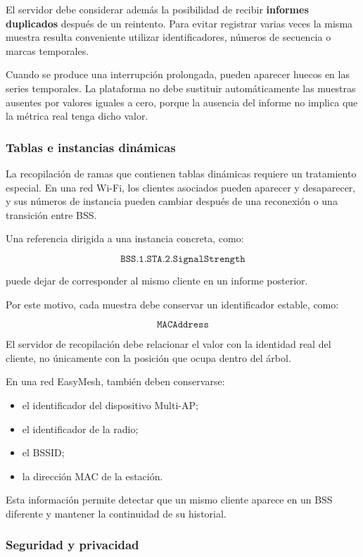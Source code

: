 El servidor debe considerar además la posibilidad de recibir
\textbf{informes duplicados} después de un reintento. Para evitar
registrar varias veces la misma muestra resulta conveniente utilizar
identificadores, números de secuencia o marcas temporales.

Cuando se produce una interrupción prolongada, pueden aparecer huecos en
las series temporales. La plataforma no debe sustituir automáticamente
las muestras ausentes por valores iguales a cero, porque la ausencia del
informe no implica que la métrica real tenga dicho valor.


\subsubsection*{Tablas e instancias dinámicas}

La recopilación de ramas que contienen tablas dinámicas requiere un
tratamiento especial. En una red Wi-Fi, los clientes asociados pueden
aparecer y desaparecer, y sus números de instancia pueden cambiar después
de una reconexión o una transición entre BSS.

Una referencia dirigida a una instancia concreta, como:

\[
    \texttt{BSS.1.STA.2.SignalStrength}
\]

puede dejar de corresponder al mismo cliente en un informe posterior.

Por este motivo, cada muestra debe conservar un identificador estable,
como:

\[
    \texttt{MACAddress}
\]

El servidor de recopilación debe relacionar el valor con la identidad
real del cliente, no únicamente con la posición que ocupa dentro del
árbol.

En una red EasyMesh, también deben conservarse:

\begin{itemize}
    \item el identificador del dispositivo Multi-AP;
    \item el identificador de la radio;
    \item el BSSID;
    \item la dirección MAC de la estación.
\end{itemize}

Esta información permite detectar que un mismo cliente aparece en un BSS
diferente y mantener la continuidad de su historial.


\subsubsection*{Seguridad y privacidad}

